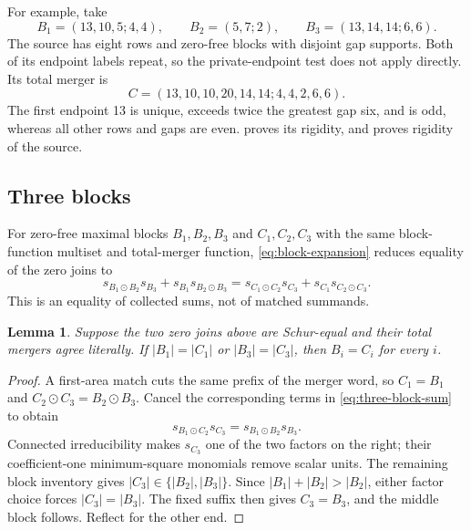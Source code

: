 \documentclass[11pt,a4paper]{amsart}
\numberwithin{equation}{section}
\theoremstyle{plain}
\newtheorem{lemma}[theorem]{Lemma}
\theoremstyle{definition}
\begin{document}
For example, take
\[
 B_1=(13,10,5;4,4),\qquad B_2=(5,7;2),\qquad
 B_3=(13,14,14;6,6).
\]
The source has eight rows and zero-free blocks with disjoint gap supports.  Both of its endpoint labels repeat, so the private-endpoint test does not apply directly.  Its total merger is
\[
 C=(13,10,10,20,14,14;4,4,2,6,6).
\]
The first endpoint 13 is unique, exceeds twice the greatest gap six, and is odd, whereas all other rows and gaps are even.   proves its rigidity, and  proves rigidity of the source.

\subsection{Three blocks}

For zero-free maximal blocks \(B_1,B_2,B_3\) and \(C_1,C_2,C_3\) with the same block-function multiset and total-merger function, \eqref{eq:block-expansion} reduces equality of the zero joins to
\begin{equation}\label{eq:three-block-sum}
 s_{B_1\odot B_2}s_{B_3}+s_{B_1}s_{B_2\odot B_3}
 =s_{C_1\odot C_2}s_{C_3}+s_{C_1}s_{C_2\odot C_3}.
\end{equation}
This is an equality of collected sums, not of matched summands.

\begin{lemma}\label{lem:retained-end-area}
Suppose the two zero joins above are Schur-equal and their total mergers agree literally.  If \(|B_1|=|C_1|\) or \(|B_3|=|C_3|\), then \(B_i=C_i\) for every \(i\).
\end{lemma}
\begin{proof}
A first-area match cuts the same prefix of the merger word, so \(C_1=B_1\) and \(C_2\odot C_3=B_2\odot B_3\).  Cancel the corresponding terms in \eqref{eq:three-block-sum} to obtain
\[
 s_{B_1\odot C_2}s_{C_3}=s_{B_1\odot B_2}s_{B_3}.
\]
Connected irreducibility makes \(s_{C_3}\) one of the two factors on the right; their coefficient-one minimum-square monomials remove scalar units.  The remaining block inventory gives \(|C_3|\in\{|B_2|,|B_3|\}\).  Since \(|B_1|+|B_2|>|B_2|\), either factor choice forces \(|C_3|=|B_3|\).  The fixed suffix then gives \(C_3=B_3\), and the middle block follows.  Reflect for the other end.
\end{proof}
\end{document}
